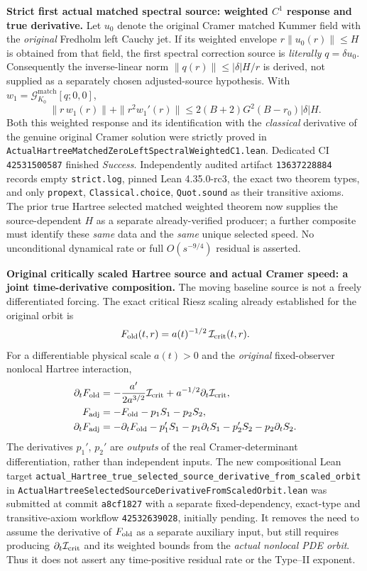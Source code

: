 \documentclass[11pt]{amsart}
\begin{document}
\medskip
\noindent\textbf{Strict first actual matched spectral source:
weighted $C^1$ response and true derivative.}
Let \(u_0\) denote the original Cramer matched Kummer field with
the \emph{original} Fredholm left Cauchy jet. If its weighted
envelope \(r\|u_0(r)\|\le H\) is obtained from that field,
the first spectral correction source is \emph{literally}
\(q=\delta u_0\). Consequently the inverse-linear norm
\(\|q(r)\|\le|\delta|H/r\) is derived, not supplied
as a separately chosen adjusted-source hypothesis.
With \(w_1=\mathcal G_{K_0}^{\mathrm{match}}[q;0,0]\),
\[
 \boxed{\;
 \|r\,w_1(r)\|+\|r^2w_1'(r)\|
 \le 2(B+2)G^2(B-r_0)|\delta|H.\;}
\]
Both this weighted response and its identification with the
\emph{classical} derivative of the genuine original Cramer solution
were strictly proved in
\texttt{ActualHartreeMatchedZeroLeftSpectralWeightedC1.lean}.
Dedicated CI \texttt{42531500587} finished
\emph{Success}. Independently audited artifact
\texttt{13637228884} records empty \texttt{strict.log},
pinned Lean 4.35.0-rc3, the exact two theorem types,
and only \texttt{propext}, \texttt{Classical.choice},
\texttt{Quot.sound} as their transitive axioms.
The prior true Hartree selected matched weighted theorem now
supplies the source-dependent \(H\) as a separate
already-verified producer; a further composite must identify
these \emph{same} data and the \emph{same} unique selected speed.
No unconditional dynamical rate or full \(O(s^{-9/4})\) residual
is asserted.


\medskip
\noindent\textbf{Original critically scaled Hartree source and actual
Cramer speed: a joint time-derivative composition.}
The moving baseline source is not a freely differentiated
forcing. The exact critical Riesz scaling already established
for the original orbit is
\[
 F_{\rm old}(t,r)=a(t)^{-1/2}\,\mathcal I_{\rm crit}(t,r).
\]
For a differentiable physical scale \(a(t)>0\) and the
\emph{original} fixed-observer nonlocal Hartree interaction,
\[
 \begin{aligned}
 \partial_tF_{\rm old}
 &= -\frac{a'}{2a^{3/2}}\mathcal I_{\rm crit}
       +a^{-1/2}\partial_t\mathcal I_{\rm crit},\\
 F_{\rm adj}
 &= -F_{\rm old}-p_1 S_1-p_2 S_2,\\
 \partial_tF_{\rm adj}
 &= -\partial_tF_{\rm old}
    -p_1'S_1-p_1\partial_tS_1
    -p_2'S_2-p_2\partial_tS_2 .
 \end{aligned}
\]
The derivatives \(p_1'\), \(p_2'\) are \emph{outputs} of the
real Cramer-determinant differentiation, rather than independent
inputs. The new compositional Lean target
\texttt{actual_Hartree_true_selected_source_derivative_from_scaled_orbit}
in
\texttt{ActualHartreeSelectedSourceDerivativeFromScaledOrbit.lean}
was submitted at commit \texttt{a8cf1827} with a separate
fixed-dependency, exact-type and transitive-axiom workflow
\texttt{42532639028}, initially pending.
It removes the need to assume the derivative of \(F_{\rm old}\)
as a separate auxiliary input, but still requires producing
\(\partial_t\mathcal I_{\rm crit}\) and its weighted bounds from
the \emph{actual nonlocal PDE orbit}. Thus it does not
assert any time-positive residual rate or the Type--II exponent.
\end{document}
